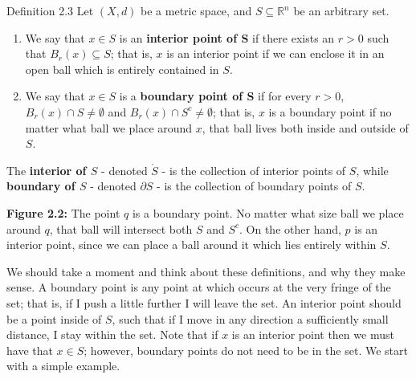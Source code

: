 \documentclass{article}
\theoremstyle{definition}
\numberwithin{equation}{section}
\begin{document}
\begin{mydefbox}{Definition 2.3}
Let $(X,d)$ be a metric space, and $S \subseteq \mathbb{R}^{n}$ be an arbitrary set.
\begin{enumerate}
    \item We say that $x \in S$ is an \textbf{interior point of S} if there exists an $r > 0$ such that $B_{r}(x) \subseteq S$; that is, $x$ is an interior point if we can enclose it in an open ball which is entirely contained in $S$.
    \item We say that $x \in S$ is a \textbf{boundary point of S} if for every $r > 0$, $B_{r}(x) \cap S \not= \emptyset$ and $B_{r}(x) \cap S^{c} \not= \emptyset$; that is, $x$ is a boundary point if no matter what ball we place around $x$, that ball lives both inside and outside of $S$. 
\end{enumerate}
\end{mydefbox}

The \textbf{interior of $S$} - denoted $\mathring{S}$ - is the collection of interior points of $S$, while \textbf{boundary of $S$} - denoted $\partial S$ - is the collection of boundary points of $S$.

\begin{center}
\end{center}

\begin{center}
\textbf{Figure 2.2:} The point $q$ is a boundary point. No matter what size ball we place around $q$, that ball will intersect both $S$ and $S^{c}$. On the other hand, $p$ is an interior point, since we can place a ball around it which lies entirely within $S$.
\end{center}

We should take a moment and think about these definitions, and why they make sense. A boundary point is any point at which occurs at the very fringe of the set; that is, if I push a little further I will leave the set. An interior point should be a point inside of $S$, such that if I move in any direction a sufficiently small distance, I stay within the set. Note that if $x$ is an interior point then we must have that $x \in S$; however, boundary points do not need to be in the set. We start with a simple example.
\end{document}
